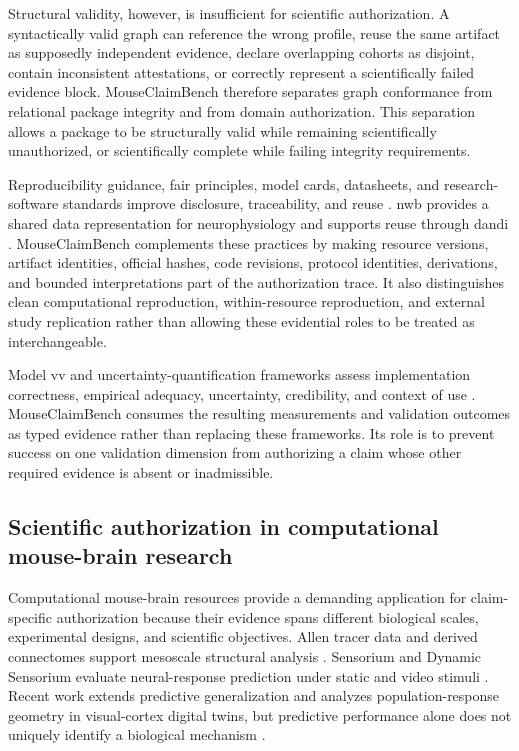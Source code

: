 \documentclass[11pt,a4paper]{article}
\begin{document}
Structural validity, however, is insufficient for scientific authorization. A
syntactically valid graph can reference the wrong profile, reuse the same
artifact as supposedly independent evidence, declare overlapping cohorts as
disjoint, contain inconsistent attestations, or correctly represent a
scientifically failed evidence block. MouseClaimBench therefore separates
graph conformance from relational package integrity and from domain
authorization. This separation allows a package to be structurally valid
while remaining scientifically unauthorized, or scientifically complete while
failing integrity requirements.

Reproducibility guidance, \ac{fair} principles, model cards, datasheets, and
research-software standards improve disclosure, traceability, and reuse
\citep{nasem2019reproducibility,wilkinson2016fair,mitchell2019modelcards,
gebru2021datasheets,pineau2021reproducibility,barker2022fair4rs}.
\ac{nwb} provides a shared data representation for neurophysiology and
supports reuse through \ac{dandi} \citep{rubel2022nwb}. MouseClaimBench
complements these practices by making resource versions, artifact identities,
official hashes, code revisions, protocol identities, derivations, and bounded
interpretations part of the authorization trace. It also distinguishes clean
computational reproduction, within-resource reproduction, and external study
replication rather than allowing these evidential roles to be treated as
interchangeable.

Model \ac{vv} and uncertainty-quantification frameworks assess
implementation correctness, empirical adequacy, uncertainty, credibility, and
context of use
\citep{oberkampf2010verification,sargent2013verification,asme2018vv40,
riedmaier2021vvuq}. MouseClaimBench consumes the resulting measurements
and validation outcomes as typed evidence rather than replacing these
frameworks. Its role is to prevent success on one validation dimension from
authorizing a claim whose other required evidence is absent or inadmissible.


\subsection{Scientific authorization in computational mouse-brain research}
\label{subsec:mouse-boundaries}

Computational mouse-brain resources provide a demanding application for
claim-specific authorization because their evidence spans different biological
scales, experimental designs, and scientific objectives. Allen tracer data and
derived connectomes support mesoscale structural analysis
\citep{oh2014mesoscale,knox2019connectome}. Sensorium and Dynamic
Sensorium evaluate neural-response prediction under static and video stimuli
\citep{willeke2022sensorium,turishcheva2023dynamic,
turishcheva2024retrospective}. Recent work extends predictive generalization
and analyzes population-response geometry in visual-cortex digital twins, but
predictive performance alone does not uniquely identify a biological
mechanism \citep{wang2025foundation,liscai2025population}.
\end{document}
